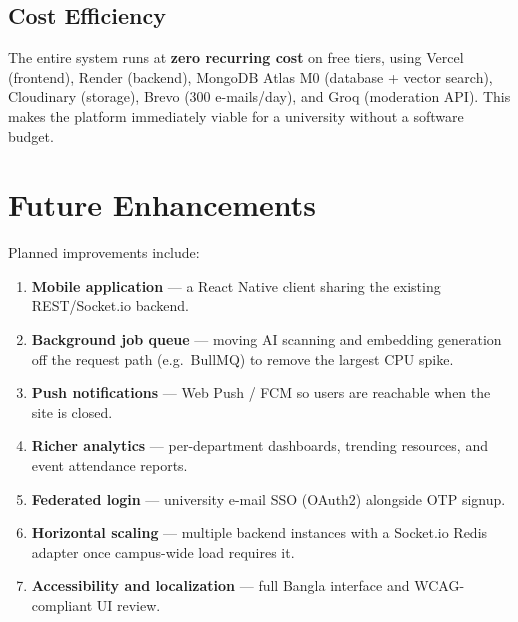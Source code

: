 \documentclass[12pt,a4paper]{report}
\begin{document}
\section{Cost Efficiency}
The entire system runs at \textbf{zero recurring cost} on free
tiers, using Vercel (frontend), Render (backend), MongoDB Atlas M0
(database + vector search), Cloudinary (storage), Brevo (300
e-mails/day), and Groq (moderation API). This makes the platform
immediately viable for a university without a software budget.

\chapter{Future Enhancements}
Planned improvements include:
\begin{enumerate}[itemsep=2pt]
  \item \textbf{Mobile application} --- a React Native client
        sharing the existing REST/Socket.io backend.
  \item \textbf{Background job queue} --- moving AI scanning and
        embedding generation off the request path (e.g.\ BullMQ) to
        remove the largest CPU spike.
  \item \textbf{Push notifications} --- Web Push / FCM so users are
        reachable when the site is closed.
  \item \textbf{Richer analytics} --- per-department dashboards,
        trending resources, and event attendance reports.
  \item \textbf{Federated login} --- university e-mail SSO (OAuth2)
        alongside OTP signup.
  \item \textbf{Horizontal scaling} --- multiple backend instances
        with a Socket.io Redis adapter once campus-wide load
        requires it.
  \item \textbf{Accessibility and localization} --- full Bangla
        interface and WCAG-compliant UI review.
\end{enumerate}

\end{document}
